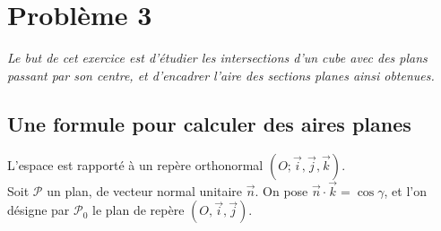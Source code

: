 \documentclass[landscape,twocolumn,leqno,a4paper,10pt]{report} %
\newcommand\n{\noindent}
\begin{document}
\section{Problème 3}

\n \textit{Le but de cet exercice est d'étudier les intersections d'un cube avec des plans passant par son centre, et d'encadrer l'aire des sections planes ainsi obtenues.}

\subsection{Une formule pour calculer des aires planes}

\n L'espace est rapporté à un repère orthonormal $(O ; \vec{i}, \vec{j}, \vec{k})$.\\
Soit $\mathscr{P}$ un plan, de vecteur normal unitaire $\vec{n}$. On pose $\vec{n} \cdot \vec{k}=\cos \gamma$, et l'on désigne par $\mathscr{P}_{0}$ le plan de repère $(O, \vec{i}, \vec{j})$.
\end{document}
